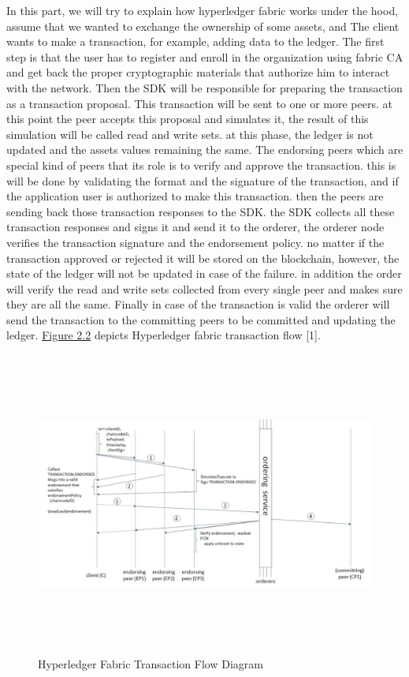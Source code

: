 In this part, we will try to explain how hyperledger fabric works under the hood,
assume that we wanted to exchange the ownership of some assets, and The client wants to make a transaction, for example, adding data to the ledger. 
The first step is that the user has to register and enroll in the organization using fabric CA and get back the proper cryptographic materials that authorize him to interact with the network. Then the SDK will be responsible for preparing the transaction as a transaction proposal. This transaction will be sent to one or more peers. 
at this point the peer accepts this proposal and simulates it, the result of this simulation will be called read and write sets. at this phase, the ledger is not updated and the assets values remaining the same. 
The endorsing peers which are special kind of peers that its role is to verify and approve the transaction. this is will be done by validating the format and the signature of the transaction, and if the application user is authorized to make this transaction. 
then the peers are sending back those transaction responses to the SDK. the SDK collects all these transaction responses and signs it and send it to the orderer, the orderer node verifies the transaction signature and the endorsement policy. no matter if the transaction approved or rejected it will be stored on the blockchain, however, the state of the ledger will not be updated in case of the failure. in addition the order will verify the read and write sets collected from every single peer and makes sure they are all the same. 
Finally in case of the transaction is valid the orderer will send the transaction to the committing peers to be committed and updating the ledger.
\hyperref[fig:transactionflow]{Figure 2.2} depicts Hyperledger fabric transaction flow [1]. 
\begin{figure}[H]
	\includegraphics[width=15cm,height=10cm]{images/transactionflow.jpg}
	\caption{Hyperledger Fabric Transaction Flow Diagram}
	\label{fig:transactionflow}
	\end{figure}

 
 

 
 

 
 





 



 
  